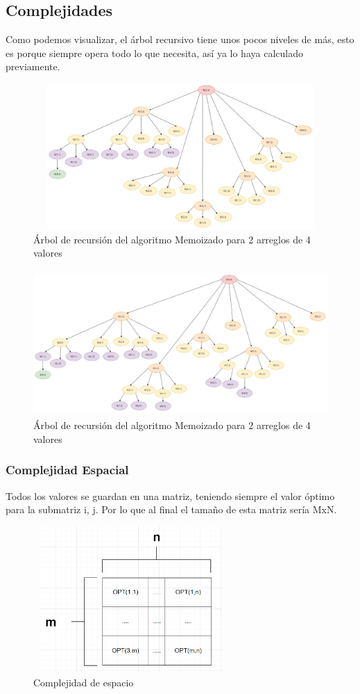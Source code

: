 \documentclass[12pt]{article}
\begin{document}
\subsection{Complejidades}
Como podemos visualizar, el árbol recursivo tiene unos pocos niveles de más, esto es porque siempre opera todo lo que necesita, así ya lo haya calculado previamente. 
 \begin{figure}[H]
		 \centering
		 \includegraphics[width=33em, height=15em]{image/Memoizado_Arbol.png}
		 \caption{Árbol de recursión del algoritmo Memoizado para 2 arreglos de 4 valores}
 \end{figure}
  \begin{figure}[H]
		 \centering
		 \includegraphics[width=33em, height=15em]{image/Recursivo arbol.png}
		 \caption{Árbol de recursión del algoritmo Memoizado para 2 arreglos de 4 valores}
 \end{figure}
\subsubsection{Complejidad Espacial}
Todos los valores se guardan en una matriz, teniendo siempre el valor óptimo para la submatriz i, j.
Por lo que al final el tamaño de esta matriz sería MxN.
\begin{figure}[H]
		 \centering
		 \includegraphics[width=20em, height=15em]{image/Matriz.png}
		 \caption{Complejidad de espacio}
\end{figure}
 
\end{document}
